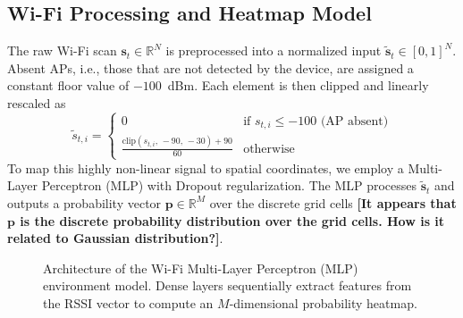 \documentclass[conference]{IEEEtran}
\begin{document}
\subsection{Wi-Fi Processing and Heatmap Model}

The raw Wi-Fi scan $\mathbf{s}_t \in \mathbb{R}^N$ is preprocessed into a normalized input $\tilde{\mathbf{s}}_t \in [0,1]^N$. Absent APs, i.e., those that are not detected by the device, are assigned a constant floor value of $-100$~dBm. Each element is then clipped and linearly rescaled as
\begin{equation}
\tilde{s}_{t,i} = \begin{cases} 0 & \text{if } s_{t,i} \leq -100 \text{ (AP absent)} \\ \frac{\text{clip}(s_{t,i},\, -90,\, -30) + 90}{60} & \text{otherwise} \end{cases} \label{eq:wifi_norm}
\end{equation}
To map this highly non-linear signal to spatial coordinates, we employ a Multi-Layer Perceptron (MLP) with Dropout regularization. The MLP processes $\tilde{\mathbf{s}}_t$ and outputs a probability vector $\mathbf{p} \in \mathbb{R}^M$ over the discrete grid cells \textbf{\color{red}[It appears that $\mathbf{p}$ is the discrete probability distribution over the grid cells. How is it related to Gaussian distribution?]}. 
\begin{figure}[htbp]
\centering
{}
\caption{Architecture of the Wi-Fi Multi-Layer Perceptron (MLP) environment model. Dense layers sequentially extract features from the RSSI vector to compute an $M$-dimensional probability heatmap.}
\label{fig:mlp_arch}
\end{figure}
\end{document}
